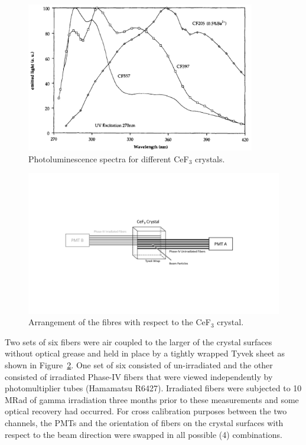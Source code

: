 \documentclass[a4paper,11pt]{article}
\begin{document}
\begin{figure}[ht]
\begin{center}
      \includegraphics[width=10cm]{Figures/SpectrumCeF3.jpg}
\caption{\small Photoluminescence spectra for different CeF$_3$ crystals.}
    \label{fig:cef3spectrum}
\end{center}
\end{figure}


\begin{figure}[ht]
\begin{center}\vspace{-1pc}
      \includegraphics[width=10 cm]{Figures/CeF3Arrangement.pdf}
\caption{\small Arrangement of the fibres with respect to the CeF$_3$ crystal.}
    \label{fig:CeF3Arrangement}
\end{center}
\end{figure}

Two sets of six fibers were air coupled to the larger of the crystal surfaces without optical grease and held in place by a tightly wrapped Tyvek sheet as shown in Figure~\ref{fig:CeF3Arrangement}.   One set of six consisted of un-irradiated and the other consisted of irradiated Phase-IV fibers that were viewed independently by photomultiplier tubes (Hamamatsu R6427).  Irradiated fibers were subjected to 10 MRad of gamma irradiation three months prior to these measurements and some optical recovery had occurred.  For cross calibration purposes between the two channels, the PMTs and the orientation of fibers on the crystal surfaces with respect to the beam direction were swapped in all possible (4) combinations.  
\end{document}
